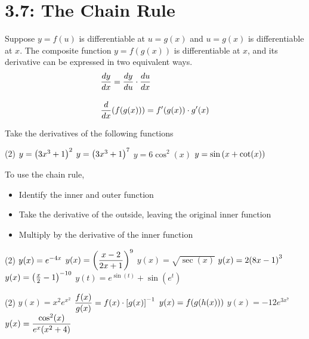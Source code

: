 \documentclass[../mathNotesPreamble]{subfiles}
\begin{document}
\section{3.7: The Chain Rule}

\begin{thmBox*}
  Suppose $y=f(u)$ is differentiable at $u=g(x)$ and $u=g(x)$ is differentiable at $x$. The composite function $y=f(g(x))$ is differentiable at $x$, and its derivative can be expressed in two equivalent ways.
    \begin{align}
      &\dfrac{dy}{dx} = \dfrac{dy}{du}\cdot \dfrac{du}{dx}\\[10pt]
      &\dfrac{d}{dx}\parens{f\parens{g(x)}}=f'\parens{g(x)}\cdot g'(x)
    \end{align}
\end{thmBox*}

\begin{ex*}
  Take the derivatives of the following functions
\end{ex*}
\begin{tasks}[after-item-skip=\stretch{1}](2)
  \task $y=\parens{3x^3+1}^2$
  \task $y=\parens{3x^3+1}^7$
  \task $y=6\cos^2(x)$
  \task $y=\sin\parens{x+\cot(x)}$
\end{tasks}

\begin{thmBox*}
  To use the chain rule,
    \begin{itemize}
      \item Identify the inner and outer function
      \item Take the derivative of the outside, leaving the original inner function
      \item Multiply by the derivative of the inner function
    \end{itemize}
\end{thmBox*}
\pagebreak

\begin{tasks}[resume, after-item-skip=\stretch{1}](2)
  \task $y(x)=e\inv[4x]$
  \task $y(x)=\parens{\dfrac{x-2}{2x+1}}^9$
  \task $y(x)=\sqrt{\sec(x)}$
  \task $y(x)=2\parens{8x-1}^3$
  \task $y(x)=\parens{\frac{x}{2}-1}\inv[10]$
  \task $y(t)=e^{\sin(t)}+\sin(e^t)$
\end{tasks}
\pagebreak

\begin{tasks}[resume, after-item-skip=\stretch{1}](2)
  \task $y(x)=x^2 e^{x^2}$
  \task $\dfrac{f(x)}{g(x)}=f(x)\cdot\sbrkt{g(x)}\inv$
  \task $y(x)=f\parens{g\parens{h(x)}}$
  \task $y(x)=-12e^{3x^7}$
  \task* $y(x)=\dfrac{\cos^2(x)}{e^x\parens{x^2+4}}$
  
\end{tasks}
\pagebreak
\end{document}
